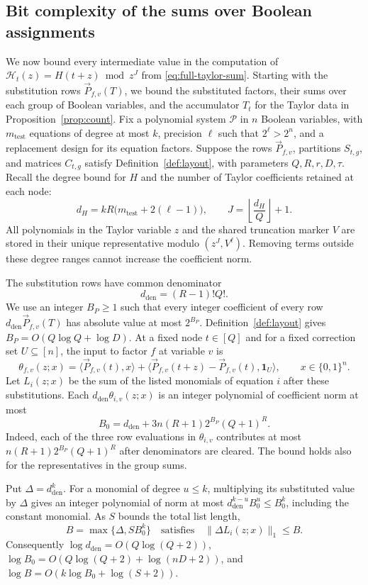 \documentclass[11pt,reqno]{amsart}
\numberwithin{equation}{section}
\theoremstyle{definition}\newtheorem{definition}[theorem]{Definition}
\theoremstyle{remark}\newtheorem{remark}[theorem]{Remark}
\renewcommand{\le}{\leqslant}
\renewcommand{\ge}{\geqslant}
\begin{document}
\subsection{Bit complexity of the sums over Boolean assignments}
\label{subsec:rational-streaming-height}
We now bound every intermediate value in the computation of
$\mathcal H_t(z)=H(t+z)\bmod z^J$ from \eqref{eq:full-taylor-sum}.
Starting with the substitution rows $\vec{P}_{f,v}(T)$, we bound the
substituted factors, their sums over each group of Boolean variables,
and the accumulator $T_t$ for the Taylor data in
Proposition~\ref{prop:count}.
Fix a polynomial system $\mathcal P$ in $n$ Boolean variables, with
$m_{\mathrm{test}}$ equations of degree at most $k$, precision
$\ell$ such that $2^\ell>2^n$, and a replacement design for its
equation factors. Suppose the rows $\vec{P}_{f,v}$,
partitions $S_{t,g}$, and matrices $C_{t,g}$ satisfy
Definition~\ref{def:layout}, with parameters $Q,R,r,D,\tau$.
Recall the degree bound for $H$ and the number of Taylor coefficients
retained at each node:
\[
 d_H=kR\bigl(m_{\mathrm{test}}+2(\ell-1)\bigr),\qquad
 J=\left\lfloor\frac{d_H}{Q}\right\rfloor+1.
\]
All polynomials in the Taylor variable $z$ and the shared truncation
marker $V$ are stored in their unique representative modulo
$(z^J,V^\ell)$. Removing terms outside these degree ranges cannot
increase the coefficient norm.

The substitution rows have common denominator
\[
 d_{\mathrm{den}}=(R-1)!Q!.
\]
We use an integer $B_P\ge1$ such that every integer coefficient of every
row $d_{\mathrm{den}}\vec{P}_{f,v}(T)$ has absolute value at most $2^{B_P}$.
Definition~\ref{def:layout} gives $B_P=O(Q\log Q+\log D)$.
At a fixed node $t\in[Q]$ and for a fixed correction set $U\subseteq[n]$,
the input to factor $f$ at variable $v$ is
\[
 \theta_{f,v}(z;x)=\langle \vec{P}_{f,v}(t), x\rangle+
       \bigl\langle \vec{P}_{f,v}(t+z)-\vec{P}_{f,v}(t),\mathbf1_U\bigr\rangle,
 \qquad x\in\{0,1\}^n.
\]
Let $L_i(z;x)$ be the sum of the listed monomials of equation $i$
after these substitutions. Each $d_{\mathrm{den}}\theta_{i,v}(z;x)$
is an integer polynomial of coefficient norm at most
\[
 B_0=d_{\mathrm{den}}+3n(R+1)2^{B_P}(Q+1)^R .
\]
Indeed, each of the three row evaluations in $\theta_{i,v}$
contributes at most $n(R+1)2^{B_P}(Q+1)^R$ after denominators are
cleared. The bound holds also for the representatives in the group sums.

Put $\Delta=d_{\mathrm{den}}^k$. For a monomial of degree $u\le k$,
multiplying its substituted value by $\Delta$ gives an integer
polynomial of norm at most $d_{\mathrm{den}}^{k-u}B_0^u\le B_0^k$,
including the constant monomial. As $S$ bounds the total list length,
\[
 B=\max\{\Delta,SB_0^k\}
 \quad\text{satisfies}\quad \|\Delta L_i(z;x)\|_1\le B .
\]
Consequently $\log d_{\mathrm{den}}=O(Q\log(Q+2))$,
$\log B_0=O(Q\log(Q+2)+\log(nD+2))$, and
$\log B=O(k\log B_0+\log(S+2))$.
\end{document}
